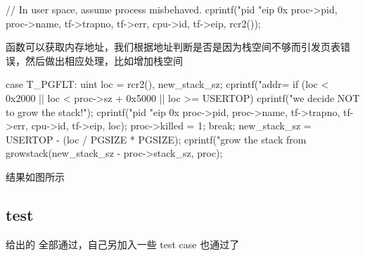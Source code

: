 \begin{ccode}
    // In user space, assume process misbehaved.
    cprintf("pid %
            "eip 0x%
            proc->pid, proc->name, tf->trapno, tf->err, cpu->id, tf->eip, 
            rcr2());
\end{ccode}

 函数可以获取内存地址，我们根据地址判断是否是因为栈空间不够而引发页表错误，然后做出相应处理，比如增加栈空间

\begin{ccode}
    case T_PGFLT:
    {
        uint loc = rcr2(), new_stack_sz;
        cprintf("addr=%
        if (loc < 0x2000 || loc < proc->sz + 0x5000 || loc >= USERTOP) {
            cprintf("we decide NOT to grow the stack!\n");
            cprintf("pid %
                "eip 0x%
                proc->pid, proc->name, tf->trapno, tf->err, cpu->id, tf->eip, 
                loc);
            proc->killed = 1;
            break;
        }
        new_stack_sz = USERTOP - (loc / PGSIZE * PGSIZE);
        cprintf("grow the stack from %
        growstack(new_stack_sz - proc->stack_sz, proc);  
    }
\end{ccode}

结果如图所示


\subsection{test}

给出的  全部通过，自己另加入一些 test case 也通过了

